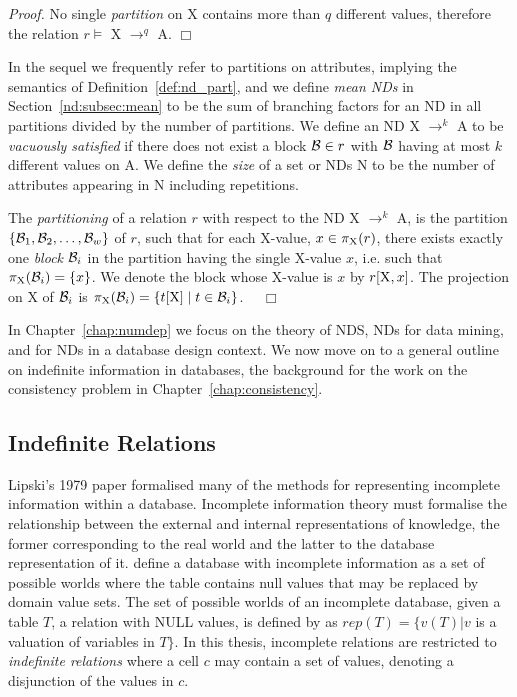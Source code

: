 {\em Proof.} No single {\em partition} on X contains more than $q$
different values, therefore the relation $r \models$ X $\to^q$ A. $\Box$

\medskip

In the sequel we frequently refer to partitions on attributes,
implying the semantics of Definition~\ref{def:nd_part}, and we define {\em mean
NDs} in Section~\ref{nd:subsec:mean} to be the sum of branching
factors for an ND in all partitions divided by the number of
partitions. We define an ND X $\to^k$ A to be 
{\em vacuously satisfied} if there does not exist a block ${\cal B}
\in r$ with ${\cal B}$ having at most $k$ different values on A.
We define the {\em size} of a set or NDs N to be the number of attributes 
appearing in N including repetitions.
\begin{definition}\label{def:nd_part}
\begin{rm}
The {\em partitioning} of a relation $r$ with respect to the ND 
X $\to^k$ A, is the partition $\{{\cal B}_1, {\cal B}_2, \ldots, {\cal B}_w\}$
of $r$, such that for each X-value, $x \in \pi_{\rm X}(r)$, 
there exists exactly one {\em block} ${\cal B}_i$ in the partition 
having the single X-value $x$, i.e. such that $\pi_{\rm X}({\cal B}_i)
= \{x\}$. 
We denote the block whose X-value is $x$ by $r[{\rm X}, x]$.
The projection on X of ${\cal B}_i$ is $\pi_{\rm X}({\cal B}_i) = \{
t[{\rm X}] \mid t \in {\cal B}_i \}$. $\quad\Box$
\end{rm}
\end{definition}

\medskip

In Chapter~\ref{chap:numdep} we focus on the theory of NDS, NDs for
data mining, and for NDs in a database design context. We now move on
to a general outline on indefinite information in databases, the
background for the work on the consistency problem in Chapter~\ref{chap:consistency}.

\subsection{Indefinite Relations}\label{subsec:rev_indef}

Lipski's 1979 paper \cite{lip79} formalised many of the methods for 
representing incomplete information within a database.  Incomplete
information theory must formalise the relationship between the external
and internal representations of knowledge, the former corresponding to
the real world and the latter to the database representation of it.
\cite{databasefound} define a database with incomplete information as a set
of possible worlds where the table contains null values that may be replaced
by domain value sets. The set of possible worlds of an incomplete
database, given a table $T$, a 
relation with NULL values, is
defined by \cite{databasefound}
as $rep(T) = \{v(T) |  v$  is a valuation of variables in  $T
\}$. In this thesis, incomplete relations are restricted to {\em
indefinite relations} where a cell $c$ may 
contain a set of values, denoting a disjunction of the values in
$c$. \\


